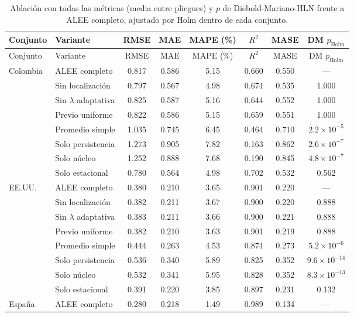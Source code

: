 \begin{longtable}{llcccccc}
\caption{Ablación con todas las métricas (media entre pliegues) y $p$ de Diebold-Mariano-HLN frente a ALEE completo, ajustado por Holm dentro de cada conjunto.}\label{tab:ablacion_completa}\\
\toprule
Conjunto & Variante & RMSE & MAE & MAPE (\%) & $R^2$ & MASE & DM $p_{\mathrm{Holm}}$ \\
\midrule
\endfirsthead
\toprule
Conjunto & Variante & RMSE & MAE & MAPE (\%) & $R^2$ & MASE & DM $p_{\mathrm{Holm}}$ \\
\midrule
\endhead
\bottomrule
\endfoot
Colombia & ALEE completo & 0.817 & 0.586 & 5.15 & 0.660 & 0.550 & --- \\
 & Sin localización & 0.797 & 0.567 & 4.98 & 0.674 & 0.535 & 1.000 \\
 & Sin $\lambda$ adaptativa & 0.825 & 0.587 & 5.16 & 0.644 & 0.552 & 1.000 \\
 & Previo uniforme & 0.822 & 0.586 & 5.15 & 0.659 & 0.551 & 1.000 \\
 & Promedio simple & 1.035 & 0.745 & 6.45 & 0.464 & 0.710 & $2.2\times10^{-5}$ \\
 & Solo persistencia & 1.273 & 0.905 & 7.82 & 0.163 & 0.862 & $2.6\times10^{-7}$ \\
 & Solo núcleo & 1.252 & 0.888 & 7.68 & 0.190 & 0.845 & $4.8\times10^{-7}$ \\
 & Solo estacional & 0.780 & 0.564 & 4.98 & 0.702 & 0.532 & 0.562 \\
\midrule
EE.UU. & ALEE completo & 0.380 & 0.210 & 3.65 & 0.901 & 0.220 & --- \\
 & Sin localización & 0.382 & 0.211 & 3.67 & 0.900 & 0.220 & 0.888 \\
 & Sin $\lambda$ adaptativa & 0.383 & 0.211 & 3.66 & 0.900 & 0.221 & 0.888 \\
 & Previo uniforme & 0.382 & 0.210 & 3.63 & 0.901 & 0.219 & 0.888 \\
 & Promedio simple & 0.444 & 0.263 & 4.53 & 0.874 & 0.273 & $5.2\times10^{-6}$ \\
 & Solo persistencia & 0.536 & 0.340 & 5.89 & 0.825 & 0.352 & $9.6\times10^{-14}$ \\
 & Solo núcleo & 0.532 & 0.341 & 5.95 & 0.828 & 0.352 & $8.3\times10^{-13}$ \\
 & Solo estacional & 0.391 & 0.220 & 3.85 & 0.897 & 0.231 & 0.132 \\
\midrule
España & ALEE completo & 0.280 & 0.218 & 1.49 & 0.989 & 0.134 & --- \\

\end{longtable}
